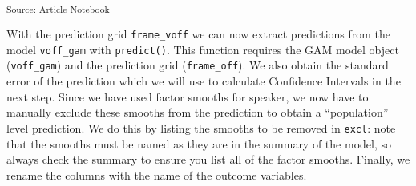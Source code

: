 \documentclass[
]{interact}
\newenvironment{Shaded}{\begin{snugshade}}{\end{snugshade}}
\newcommand{\AttributeTok}[1]{\textcolor[rgb]{0.40,0.45,0.13}{#1}}
\newcommand{\CommentTok}[1]{\textcolor[rgb]{0.37,0.37,0.37}{#1}}
\newcommand{\DecValTok}[1]{\textcolor[rgb]{0.68,0.00,0.00}{#1}}
\newcommand{\FloatTok}[1]{\textcolor[rgb]{0.68,0.00,0.00}{#1}}
\newcommand{\FunctionTok}[1]{\textcolor[rgb]{0.28,0.35,0.67}{#1}}
\newcommand{\NormalTok}[1]{\textcolor[rgb]{0.00,0.23,0.31}{#1}}
\newcommand{\OtherTok}[1]{\textcolor[rgb]{0.00,0.23,0.31}{#1}}
\newcommand{\SpecialCharTok}[1]{\textcolor[rgb]{0.37,0.37,0.37}{#1}}
\newcommand{\StringTok}[1]{\textcolor[rgb]{0.13,0.47,0.30}{#1}}
\begin{document}
\begin{Shaded}
\end{Shaded}

\textsubscript{Source:
\href{https://stefanocoretta.github.io/mv_uti/index.qmd.html}{Article
Notebook}}

With the prediction grid \texttt{frame\_voff} we can now extract
predictions from the model \texttt{voff\_gam} with \texttt{predict()}.
This function requires the GAM model object (\texttt{voff\_gam}) and the
prediction grid (\texttt{frame\_off}). We also obtain the standard error
of the prediction which we will use to calculate Confidence Intervals in
the next step. Since we have used factor smooths for speaker, we now
have to manually exclude these smooths from the prediction to obtain a
``population'' level prediction. We do this by listing the smooths to be
removed in \texttt{excl}: note that the smooths must be named as they
are in the summary of the model, so always check the summary to ensure
you list all of the factor smooths. Finally, we rename the columns with
the name of the outcome variables.
\end{document}
